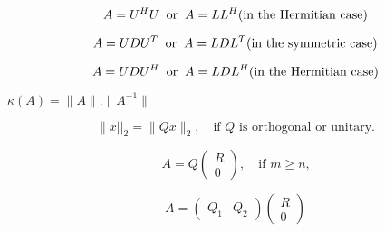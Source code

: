 {\newpage\clearpage
{}%
\begin{displaymath} A = U^{H}U \; \; {\rm or}\; \; A = LL^{H} \mbox{(in the Hermitian case)}\end{displaymath}%
\lthtmldisplayZ
\lthtmlcheckvsize\clearpage}

{\newpage\clearpage
{}%
\begin{displaymath} A = U D U^{T} \; \; {\rm or}\; \; A = L D L^{T} \mbox{(in the symmetric case)}\end{displaymath}%
\lthtmldisplayZ
\lthtmlcheckvsize\clearpage}

{\newpage\clearpage
{}%
\begin{displaymath} A = U D U^{H} \; \; {\rm or}\; \; A = L D L^{H} \mbox{(in the Hermitian case)}\end{displaymath}%
\lthtmldisplayZ
\lthtmlcheckvsize\clearpage}

{\newpage\clearpage
{}%
$\kappa(A) = \|A\| . \|A^{-1} \|$%
\lthtmlinlinemathZ
\lthtmlcheckvsize\clearpage}

{\newpage\clearpage
{}%
\begin{displaymath}
\|x||_2 = \|Qx\|_2, \quad \mbox{if $Q$\  is orthogonal or unitary.}
\end{displaymath}%
\lthtmldisplayZ
\lthtmlcheckvsize\clearpage}

{\newpage\clearpage
{}%
\begin{displaymath}
A = Q\left( \begin{array}{c}R\\0\end{array}\right), \quad \mbox{if $m \ge n$,}
\end{displaymath}%
\lthtmldisplayZ
\lthtmlcheckvsize\clearpage}

{\newpage\clearpage
{}%
\begin{displaymath}
A = \left( \begin{array}{cc} Q_1 & Q_2\end{array} \right)
    \left( \begin{array}{c}R\\0\end{array}\right)
\end{displaymath}%
\lthtmldisplayZ
\lthtmlcheckvsize\clearpage}


